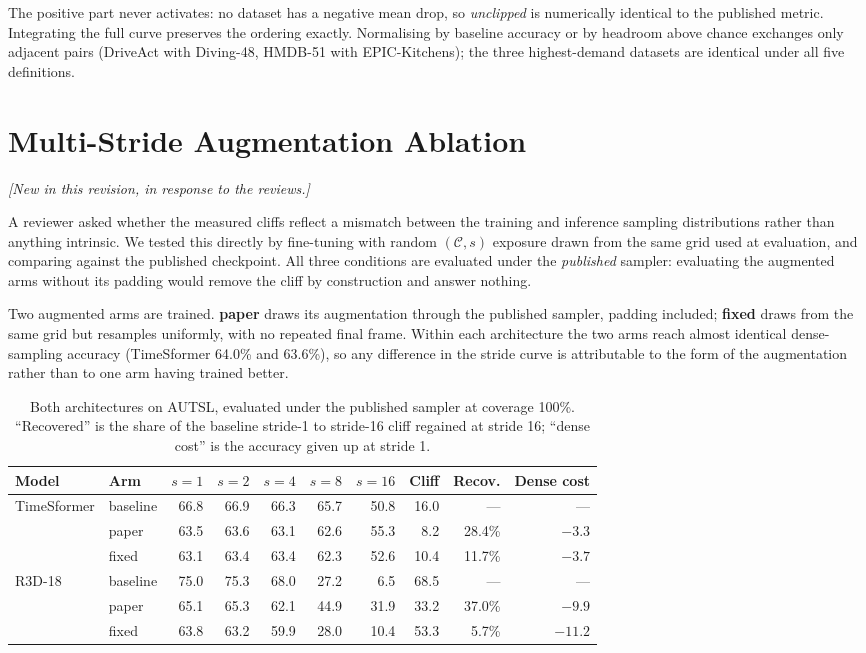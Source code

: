 \documentclass[runningheads]{llncs}
\newcommand{\tabtight}{\setlength{\tabcolsep}{3.5pt}\renewcommand{\arraystretch}{1.12}}
\newcommand{\rev}[1]{\textcolor{revblue}{#1}}
\newcommand{\revnote}{\noindent\textcolor{revblue}{\small\itshape
  [New in this revision, in response to the reviews.]}\par\vspace{2pt}}
\begin{document}
The positive part never activates: no dataset has a negative mean drop, so
\emph{unclipped} is numerically identical to the published metric. Integrating
the full curve preserves the ordering exactly. Normalising by baseline accuracy
or by headroom above chance exchanges only adjacent pairs (DriveAct with
Diving-48, HMDB-51 with EPIC-Kitchens); the three highest-demand datasets are
identical under all five definitions.

\section{\rev{Multi-Stride Augmentation Ablation}}
\revnote
\label{sec:sup_tra}

A reviewer asked whether the measured cliffs reflect a mismatch between the
training and inference sampling distributions rather than anything intrinsic. We
tested this directly by fine-tuning with random $(\mathcal{C},s)$ exposure drawn
from the same grid used at evaluation, and comparing against the published
checkpoint. All three conditions are evaluated under the \emph{published}
sampler: evaluating the augmented arms without its padding would remove the
cliff by construction and answer nothing.

Two augmented arms are trained. \textbf{paper} draws its augmentation through the
published sampler, padding included; \textbf{fixed} draws from the same grid but
resamples uniformly, with no repeated final frame. Within each architecture the
two arms reach almost identical dense-sampling accuracy (TimeSformer 64.0\% and
63.6\%), so any difference in the stride curve is attributable to the form of the
augmentation rather than to one arm having trained better.

\begin{table}[!htbp]
\centering
\caption{Both architectures on AUTSL, evaluated under the published sampler at
coverage 100\%. ``Recovered'' is the share of the baseline stride-1 to stride-16
cliff regained at stride 16; ``dense cost'' is the accuracy given up at stride 1.}
\label{tab:sup_tra}
\scriptsize\tabtight
\begin{tabular}{l l rrrrr r r r}
\toprule
Model & Arm & $s{=}1$ & $s{=}2$ & $s{=}4$ & $s{=}8$ & $s{=}16$ & Cliff & Recov. & Dense cost \\
\midrule
\multirow{3}{*}{TimeSformer}
 & baseline & 66.8 & 66.9 & 66.3 & 65.7 & 50.8 & 16.0 & --- & --- \\
 & paper    & 63.5 & 63.6 & 63.1 & 62.6 & 55.3 &  8.2 & 28.4\% & $-3.3$ \\
 & fixed    & 63.1 & 63.4 & 63.4 & 62.3 & 52.6 & 10.4 & 11.7\% & $-3.7$ \\
\midrule
\multirow{3}{*}{R3D-18}
 & baseline & 75.0 & 75.3 & 68.0 & 27.2 &  6.5 & 68.5 & --- & --- \\
 & paper    & 65.1 & 65.3 & 62.1 & 44.9 & 31.9 & 33.2 & 37.0\% & $-9.9$ \\
 & fixed    & 63.8 & 63.2 & 59.9 & 28.0 & 10.4 & 53.3 &  5.7\% & $-11.2$ \\
\bottomrule
\end{tabular}
\end{table}
\end{document}
